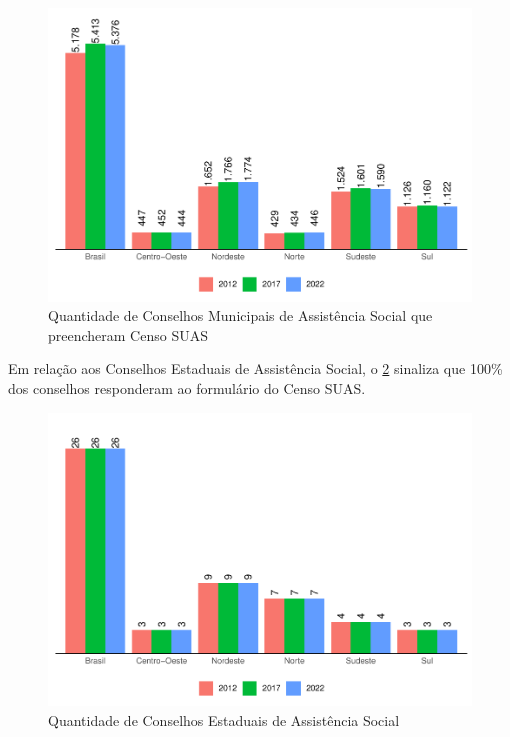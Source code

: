 \documentclass[
  brazilian]{report}
\begin{document}
\begin{figure}
\includegraphics{Censo-SUAS-2022_files/figure-latex/qtd-cmas-1} \caption[Quantidade de Conselhos Municipais de Assistência Social que preencheram Censo SUAS]{Quantidade de Conselhos Municipais de Assistência Social que preencheram Censo SUAS}\label{fig:qtd-cmas}
\end{figure}

Em relação aos Conselhos Estaduais de Assistência Social, o
\cref{fig:qtd-ceas} sinaliza que 100\% dos conselhos responderam ao
formulário do Censo SUAS.

\begin{figure}
\includegraphics{Censo-SUAS-2022_files/figure-latex/qtd-ceas-1} \caption[Quantidade de Conselhos Estaduais de Assistência Social]{Quantidade de Conselhos Estaduais de Assistência Social}\label{fig:qtd-ceas}
\end{figure}
\end{document}
